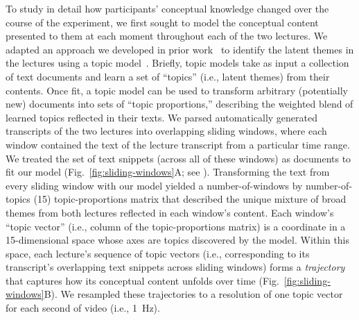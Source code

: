 \documentclass[10pt]{article}
\renewcommand{\nameref}[1]{\mbox{\textit{\oldnameref{#1}}}}
\begin{document}
To study in detail how participants' conceptual knowledge changed over the
course of the experiment, we first sought to model the conceptual content
presented to them at each moment throughout each of the two lectures. We
adapted an approach we developed in prior work~\citep{HeusEtal21} to identify
the latent themes in the lectures using a topic model~\citep{BleiEtal03}.
Briefly, topic models take as input a collection of text documents and learn a
set of ``topics'' (i.e., latent themes) from their contents. Once fit, a topic
model can be used to transform arbitrary (potentially new) documents into sets
of ``topic proportions,'' describing the weighted blend of learned topics
reflected in their texts. We parsed automatically generated transcripts of the
two lectures into overlapping sliding windows, where each window contained the
text of the lecture transcript from a particular time range. We treated the set
of text snippets (across all of these windows) as documents to fit our model
(Fig.~\ref{fig:sliding-windows}A; see \nameref{subsec:topic-modeling}).
Transforming the text from every sliding window with our model yielded a
number-of-windows by number-of-topics (15) topic-proportions matrix that
described the unique mixture of broad themes from both lectures reflected in
each window's content. Each window's ``topic vector'' (i.e., column of the
topic-proportions matrix) is a coordinate in a 15-dimensional space whose axes
are topics discovered by the model. Within this space, each lecture's sequence
of topic vectors (i.e., corresponding to its transcript's overlapping text
snippets across sliding windows) forms a \textit{trajectory} that captures how
its conceptual content unfolds over time (Fig.~\ref{fig:sliding-windows}B). We
resampled these trajectories to a resolution of one topic vector for each
second of video (i.e., 1~Hz).
\end{document}
